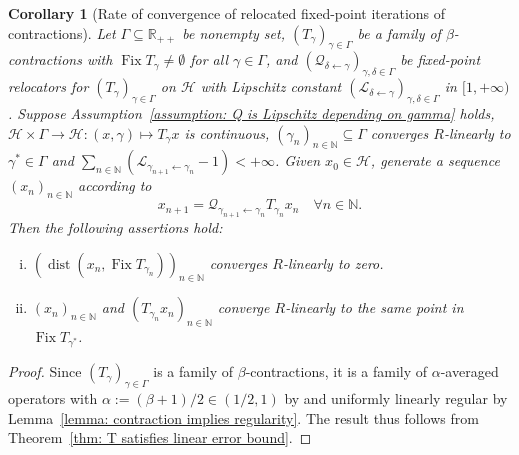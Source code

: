 \documentclass[a4paper,12pt]{article}
\newtheorem{corollary}[theorem]{Corollary}
\DeclareMathOperator{\Fix}{Fix}
\DeclareMathOperator{\dist}{dist}
\begin{document}
\begin{corollary}[Rate of convergence of relocated fixed-point iterations of contractions]\label{cor: linear convergence for contraction}
Let $\Gamma\subseteq\mathbb{R}_{++}$ be nonempty set, $(T_\gamma)_{\gamma\in\Gamma}$ be a family of $\beta$-contractions with $\Fix{T_{\gamma}}\neq\emptyset$ for all $\gamma\in\Gamma$, and $(\mathcal{Q}_{\delta\leftarrow\gamma})_{\gamma,\delta\in\Gamma}$ be fixed-point relocators for $(T_\gamma)_{\gamma\in\Gamma}$ on $\mathcal{H}$ with Lipschitz constant $(\mathcal{L_{\delta\leftarrow\gamma}})_{\gamma,\delta\in\Gamma}$ in $[1,+\infty)$. Suppose Assumption~\ref{assumption: Q is Lipschitz depending on gamma} holds, $\mathcal{H}\times \Gamma\to \mathcal{H}\colon (x,\gamma)\mapsto T_{\gamma}x$ is continuous, $(\gamma_n)_{n\in\mathbb{N}}\subseteq\Gamma$ converges $R$-linearly to $\gamma^*\in\Gamma$ and $\sum_{n\in\mathbb{N}}(\mathcal{L}_{\gamma_{n+1}\leftarrow\gamma_n}-1)<+\infty$.
    Given $x_0\in\mathcal{H}$, generate a sequence $(x_n)_{n\in\mathbb{N}}$ according to
    \begin{equation}\label{eq-NDR:iteration for fixed-point relocator-error-bound-cor}
x_{n+1}=\mathcal{Q}_{\gamma_{n+1}\leftarrow\gamma_n}T_{\gamma_{n}}x_n \quad \forall n\in\mathbb{N}.
    \end{equation}
    Then the following assertions hold:
    \begin{enumerate}[(i)]
    \item $(\dist(x_n,\Fix T_{\gamma_n}))_{n\in\mathbb{N}}$ converges $R$-linearly to zero.
        \item $(x_n)_{n\in\mathbb{N}}$ and $(T_{\gamma_n}x_n)_{n\in\mathbb{N}}$ converge $R$-linearly to the same point in $\Fix T_{\gamma^*}$.
    \end{enumerate}
\end{corollary}
\begin{proof}
Since $(T_\gamma)_{\gamma\in\Gamma}$ is a family of $\beta$-contractions, it is a family of $\alpha$-averaged operators with $\alpha:=(\beta+1)/2\in(1/2,1)$ by \cite[Proposition~4.38]{bauschke2017convex} and uniformly linearly regular by Lemma~\ref{lemma: contraction implies regularity}. The result thus follows from Theorem~\ref{thm: T satisfies linear error bound}.
\end{proof}
\end{document}
